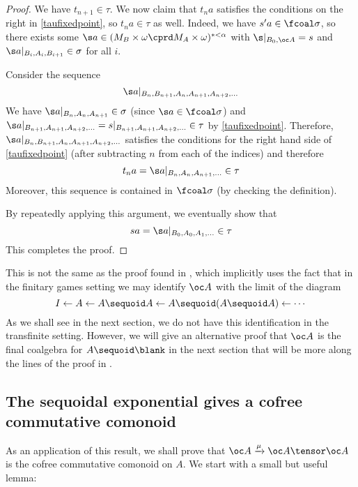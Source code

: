 \documentclass[11pt]{article} %
\begin{document}
\begin{theorem}
\begin{proof}
    We have $t_{n+1}\in\tau$.  We now claim that $t_{n}a$ satisfies the conditions on the right in \eqref{taufixedpoint}, so $t_n a\in\tau$ as well.  Indeed, we have $s'a\in\fcoal\sigma$, so there exists some $\s a\in(M_B\times\omega\cprd M_A\times\omega)^{*<\alpha}$ with $\s\vert_{B_0,\oc A}=s$ and $\s a\vert_{B_i,A_i,B_{i+1}}\in\sigma$ for all $i$.  

    Consider the sequence
    \[
      \s a\vert_{B_n,B_{n+1},A_n,A_{n+1},A_{n+2},\dots}
      \]
    We have $\s a\vert_{B_n,A_n,A_{n+1}}\in\sigma$ (since $\s a\in\fcoal\sigma$) and $\s a\vert_{B_{n+1},A_{n+1},A_{n+2},\dots}=s \vert_{B_{n+1},A_{n+1},A_{n+2},\dots}\in\tau$ by \eqref{taufixedpoint}.  Therefore, $\s a\vert_{B_n,B_{n+1},A_n,A_{n+1},A_{n+2},\dots}$ satisfies the conditions for the right hand side of \eqref{taufixedpoint} (after subtracting $n$ from each of the indices) and therefore 
    \[
      t_n a=\s a\vert_{B_n,A_n,A_{n+1},\dots}\in\tau
      \]
    Moreover, this sequence is contained in $\fcoal\sigma$ (by checking the definition).

    By repeatedly applying this argument, we eventually show that 
    \[
      sa=\s a\vert_{B_0,A_0,A_1,\dots}\in\tau
      \]
    This completes the proof.
  \end{proof}
\end{theorem}

\begin{note}
  This is not the same as the proof found in \cite{martinsthesis}, which implicitly uses the fact that in the finitary games setting we may identify $\oc A$ with the limit of the diagram
  \[
    I \leftarrow A \leftarrow A\sequoid A \leftarrow A\sequoid(A\sequoid A) \leftarrow \cdots
    \]
  As we shall see in the next section, we do not have this identification in the transfinite setting.  However, we will give an alternative proof that $\oc A$ is the final coalgebra for $A\sequoid\blank$ in the next section that will be more along the lines of the proof in \cite{martinsthesis}.  
\end{note}

\pagebreak

\subsection{The sequoidal exponential gives a cofree commutative comonoid}
\label{SeqExpIsCofCommCom}

As an application of this result, we shall prove that $\oc A\xrightarrow{\mu}\oc A\tensor \oc A$ is the cofree commutative comonoid on $A$.  We start with a small but useful lemma:
\end{document}
